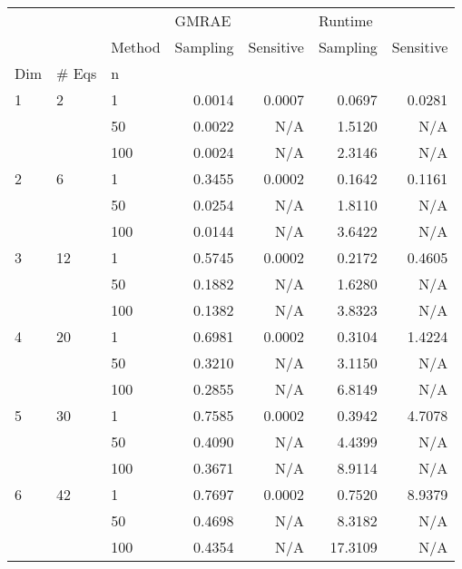 \begin{tabular}{lllrrrr}
\toprule
  &    & {} & \multicolumn{2}{l}{GMRAE} & \multicolumn{2}{l}{Runtime} \\
  &    & Method & Sampling & Sensitive & Sampling & Sensitive \\
Dim & \# Eqs & n &          &           &          &           \\
\midrule
1 & 2  & 1   &   0.0014 &    0.0007 &   0.0697 &    0.0281 \\
  &    & 50  &   0.0022 &       N/A &   1.5120 &       N/A \\
  &    & 100 &   0.0024 &       N/A &   2.3146 &       N/A \\
2 & 6  & 1   &   0.3455 &    0.0002 &   0.1642 &    0.1161 \\
  &    & 50  &   0.0254 &       N/A &   1.8110 &       N/A \\
  &    & 100 &   0.0144 &       N/A &   3.6422 &       N/A \\
3 & 12 & 1   &   0.5745 &    0.0002 &   0.2172 &    0.4605 \\
  &    & 50  &   0.1882 &       N/A &   1.6280 &       N/A \\
  &    & 100 &   0.1382 &       N/A &   3.8323 &       N/A \\
4 & 20 & 1   &   0.6981 &    0.0002 &   0.3104 &    1.4224 \\
  &    & 50  &   0.3210 &       N/A &   3.1150 &       N/A \\
  &    & 100 &   0.2855 &       N/A &   6.8149 &       N/A \\
5 & 30 & 1   &   0.7585 &    0.0002 &   0.3942 &    4.7078 \\
  &    & 50  &   0.4090 &       N/A &   4.4399 &       N/A \\
  &    & 100 &   0.3671 &       N/A &   8.9114 &       N/A \\
6 & 42 & 1   &   0.7697 &    0.0002 &   0.7520 &    8.9379 \\
  &    & 50  &   0.4698 &       N/A &   8.3182 &       N/A \\
  &    & 100 &   0.4354 &       N/A &  17.3109 &       N/A \\
\bottomrule
\end{tabular}
